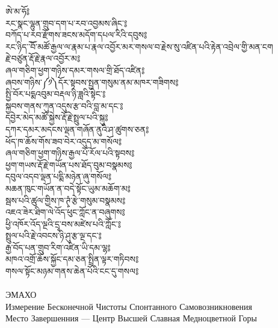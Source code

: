 {\ti ཨེ་མ་ཧོ༔\\
རང་སྣང་ལྷུན་གྲུབ་དག་པ་རབ་འབྱམས་ཞིང་༔\\
བཀོད་པ་རབ་རྫོགས་ཟངས་མདོག་དཔལ་རིའི་དབུས༔\\
རང་ཉིད་ོ་བོ་མཚོ་རྒྱལ་ལ་རྣམ་པ་རྣལ་འབྱོར་མར་གསལ་བ་རྗེས་སུ་འཛིན་པའི་རྟེན་འབྲེལ་གྱི་མན་ངག\\
རྗེ་བཙུན་རྡོ་རྗེ་རྣལ་འབྱོར་མ༔\\
ཞལ་གཅིག་ཕྱག་གཉིས་དམར་གསལ་གྲི་ཐོད་འཛིན༔\\
ཞབས་གཉིས་༼༡༽དོར་སྟབས་སྤྱན་གསུམ་ནམ་མཁར་གཟིགས༔\\
སྤྱི་བོར་པདྨའབུམ་བརྡལ་ཉི་ཟླའི་སྟེང་༔\\
སྐྱབས་གནས་ཀུན་འདུས་རྩ་བའི་བླ་མ་དང་༔\\
དབྱེར་མེད་མཚོ་སྐྱེས་རྡོ་རྗེ་སྤྲུལ་པའི་སྐུ༔\\
དཀར་དམར་མདངས་ལྡན་གཞོན་ནུའི་ཤ་ཚུགས་ཅན༔\\
ཕོད་ཁ་ཆོས་གོས་ཟབ་བེར་འདུད་མ་གསོལ༔\\
ཞལ་གཅིག་ཕྱག་གཉིས་རྒྱལ་པོ་རོལ་པའི་སྟབས༔\\
ཕྱག་གཡས་རྡོ་རྗེ་གཡོན་པས་ཐོད་བུམ་བསྣམས༔\\
དབུལ་འདབ་ལྡན་པདྨི་མཉེན་ཞུ་གསོལ༔\\
མཆན་ཁུང་གཡོན་ན་བདེ་སྟོང་ཡུམ་མཆོག་མ༔\\
སྦས་པའི་ཚུལ་གྱིས་ཁ་ཊྭཾ་རྩེ་གསུམ་བསྣམས༔\\
འཇའ་ཟེར་ཐིག་ལེ་འོད་ཕུང་ཀློང་ན་བཞུགས༔\\
ཕྱི་འཁོར་འོད་ལྔའི་དྲྭ་བས་མཛེས་པའི་ཀློང་༔\\
སྤྲུལ་པའི་རྗེ་འབངས་ཉི་ཤུ་རྩ་ལྔ་དང་༔\\
རྒྱ་བོད་པན་གྲུབ་རིག་འཛིན་ཡི་དམ་ལྷ༔\\
མཁའ་འགྲོ་ཆོས་སྐྱོང་དམ་ཅན་སྤྲིན་ལྟར་གཏིབས༔\\
གསལ་སྟོང་མཉམ་གནས་ཆེན་པོའི་ངང་དུ་གསལ༔}\\
\\
\ru ЭМАХО\\
Измерение Бесконечной Чистоты Спонтанного Самовозникновения\\
Место Завершенния — Центр Высшей Славная Медноцветной Горы\\
\\
